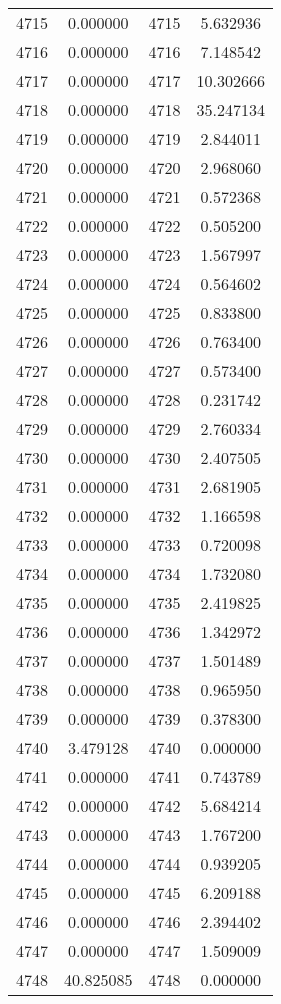 \documentclass[12pt]{article}
\begin{document}
\begin{longtable}{@{}cccc@{}}
4715 & 0.000000 & 4715 & 5.632936 \\
4716 & 0.000000 & 4716 & 7.148542 \\
4717 & 0.000000 & 4717 & 10.302666 \\
4718 & 0.000000 & 4718 & 35.247134 \\
4719 & 0.000000 & 4719 & 2.844011 \\
4720 & 0.000000 & 4720 & 2.968060 \\
4721 & 0.000000 & 4721 & 0.572368 \\
4722 & 0.000000 & 4722 & 0.505200 \\
4723 & 0.000000 & 4723 & 1.567997 \\
4724 & 0.000000 & 4724 & 0.564602 \\
4725 & 0.000000 & 4725 & 0.833800 \\
4726 & 0.000000 & 4726 & 0.763400 \\
4727 & 0.000000 & 4727 & 0.573400 \\
4728 & 0.000000 & 4728 & 0.231742 \\
4729 & 0.000000 & 4729 & 2.760334 \\
4730 & 0.000000 & 4730 & 2.407505 \\
4731 & 0.000000 & 4731 & 2.681905 \\
4732 & 0.000000 & 4732 & 1.166598 \\
4733 & 0.000000 & 4733 & 0.720098 \\
4734 & 0.000000 & 4734 & 1.732080 \\
4735 & 0.000000 & 4735 & 2.419825 \\
4736 & 0.000000 & 4736 & 1.342972 \\
4737 & 0.000000 & 4737 & 1.501489 \\
4738 & 0.000000 & 4738 & 0.965950 \\
4739 & 0.000000 & 4739 & 0.378300 \\
4740 & 3.479128 & 4740 & 0.000000 \\
4741 & 0.000000 & 4741 & 0.743789 \\
4742 & 0.000000 & 4742 & 5.684214 \\
4743 & 0.000000 & 4743 & 1.767200 \\
4744 & 0.000000 & 4744 & 0.939205 \\
4745 & 0.000000 & 4745 & 6.209188 \\
4746 & 0.000000 & 4746 & 2.394402 \\
4747 & 0.000000 & 4747 & 1.509009 \\
4748 & 40.825085 & 4748 & 0.000000 \\

\end{longtable}
\end{document}
